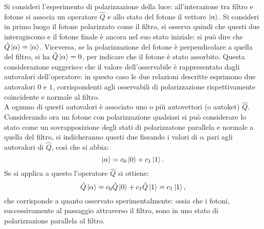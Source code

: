 Si consideri l'esperimento di polarizzazione della luce: all'interazione tra filtro e fotone si associa un operatore $\hat Q$ e allo stato del fotone il vettore $\ket{\alpha}$. Si consideri in primo luogo il fotone polarizzato come il filtro, si osserva quindi che questi due interagiscono e il fotone finale è ancora nel suo stato iniziale: si può dire che $\hat Q\ket{\alpha}=\ket\alpha$. Viceversa, se la polarizzazione del fotone è perpendicolare a quella del filtro, si ha $\hat Q\ket{\alpha}=0$, per indicare che il fotone è stato assorbito. Questa considerazione suggerisce che il valore dell'osservabile è rappresentato dagli autovalori dell'operatore: in questo caso le due relazioni descritte esprimono due autovalori $0$ e $1$, corrispondenti agli osservabili di polarizzazione rispettivamente coincidente e normale al filtro.\\ A ognuno di questi autovalori è associato uno o più autovettori (o autoket) $\hat Q$.\\
Considerando ora un fotone con polarizzazione qualsiasi si può considerare lo stato come un sovrapposizione degli stati di polarizzatone parallela e normale a quella del filtro, si indicheranno questi due fissando i valori di $\alpha$ pari agli autovalori di $\hat Q$, così che si abbia:
\begin{equation*}
    \ket{\alpha}=c_0\ket{0}+c_1\ket{1}.
\end{equation*}
Se si applica a questo l'operatore $\hat Q$ si ottiene:
\begin{equation*}
    \hat Q\ket{\alpha}=c_0\hat Q\ket{0}+c_1\hat Q\ket{1}=c_1\ket{1},
\end{equation*}
che corrisponde a quanto osservato sperimentalmente: ossia che i fotoni, successivamente al passaggio attraverso il filtro, sono in uno stato di polarizzazione parallela al filtro.

